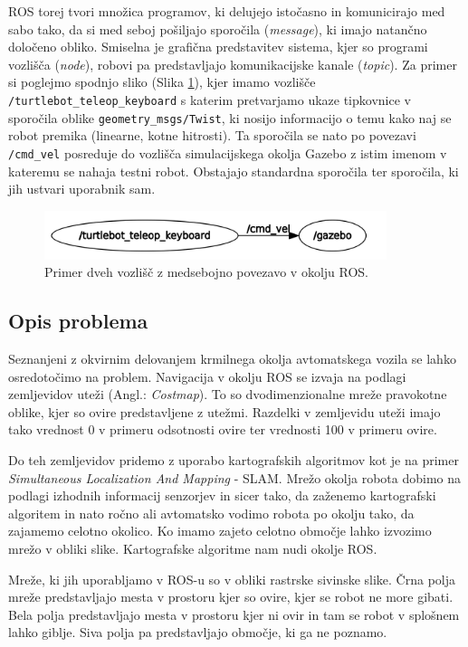 \documentclass[10pt,a4paper]{article}
\begin{document}
ROS torej tvori množica programov, ki delujejo istočasno in komunicirajo med sabo tako, da si med seboj pošiljajo sporočila (\textit{message}), ki imajo natančno določeno obliko. Smiselna je grafična predstavitev sistema, kjer so programi vozlišča (\textit{node}), robovi pa predstavljajo komunikacijske kanale (\textit{topic}). Za primer si poglejmo spodnjo sliko (Slika \ref{fig:sl1}), kjer imamo vozlišče \texttt{/turtlebot\_teleop\_keyboard} s katerim pretvarjamo ukaze tipkovnice v sporočila oblike \texttt{geometry\_msgs/Twist}, ki nosijo informacijo o temu kako naj se robot premika (linearne, kotne hitrosti). Ta sporočila se nato po povezavi \texttt{/cmd\_vel} posreduje do vozlišča simulacijskega okolja Gazebo z istim imenom v kateremu se nahaja testni robot. Obstajajo standardna sporočila ter sporočila, ki jih ustvari uporabnik sam.

\begin{figure}[H]
	\centering
	\includegraphics[width=10cm]{pic/ros.png}
	\caption{Primer dveh vozlišč z medsebojno povezavo v okolju ROS.}
	\label{fig:sl1}
\end{figure}

\subsection{Opis problema}

Seznanjeni z okvirnim delovanjem krmilnega okolja avtomatskega vozila se lahko osredotočimo na problem. Navigacija v okolju ROS se izvaja na podlagi zemljevidov uteži (Angl.: \textit{Costmap}). To so dvodimenzionalne mreže pravokotne oblike, kjer so ovire predstavljene z utežmi. Razdelki v zemljevidu uteži imajo tako vrednost 0 v primeru odsotnosti ovire ter vrednosti 100 v primeru ovire.

Do teh zemljevidov pridemo z uporabo kartografskih algoritmov kot je na primer \textit{Simultaneous Localization And Mapping} - SLAM. Mrežo okolja robota dobimo na podlagi izhodnih informacij senzorjev in sicer tako, da zaženemo kartografski algoritem in nato ročno ali avtomatsko vodimo robota po okolju tako, da zajamemo celotno okolico. Ko imamo zajeto celotno območje lahko izvozimo mrežo v obliki slike. Kartografske algoritme nam nudi okolje ROS. 

Mreže, ki jih uporabljamo v ROS-u so v obliki rastrske sivinske slike. Črna polja mreže predstavljajo mesta v prostoru kjer so ovire, kjer se robot ne more gibati. Bela polja predstavljajo mesta v prostoru kjer ni ovir in tam se robot v splošnem lahko giblje. Siva polja pa predstavljajo območje, ki ga ne poznamo.
\end{document}
